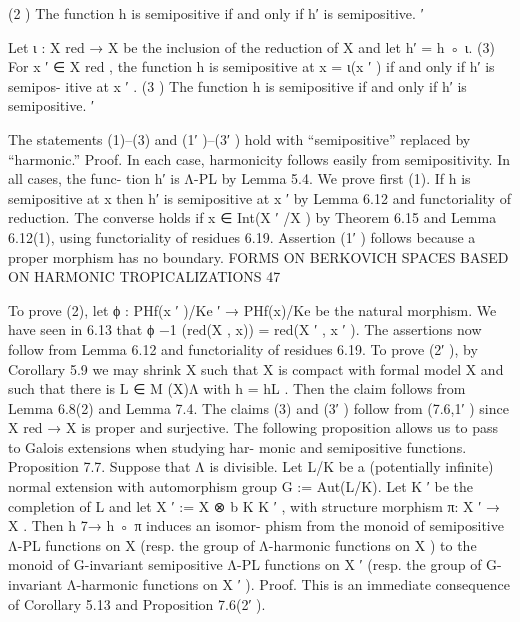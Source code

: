 \documentclass[
  10pt,
]{article}
\newenvironment{Shaded}{}{}
\newcommand{\NormalTok}[1]{#1}
\begin{document}
\begin{Shaded}
\begin{Highlighting}[]
\NormalTok{    (2 ) The function h is semipositive if and only if h′ is semipositive.}
\NormalTok{       ′}

\NormalTok{Let ι : X red → X be the inclusion of the reduction of X and let h′ = h ◦ ι.}
\NormalTok{     (3) For x ′ ∈ X red , the function h is semipositive at x = ι(x ′ ) if and only if h′ is semipos{-}}
\NormalTok{           itive at x ′ .}
\NormalTok{    (3 ) The function h is semipositive if and only if h′ is semipositive.}
\NormalTok{       ′}

\NormalTok{The statements (1)–(3) and (1′ )–(3′ ) hold with “semipositive” replaced by “harmonic.”}
\NormalTok{Proof. In each case, harmonicity follows easily from semipositivity. In all cases, the func{-}}
\NormalTok{tion h′ is Λ{-}PL by Lemma 5.4.}
\NormalTok{   We prove first (1). If h is semipositive at x then h′ is semipositive at x ′ by Lemma 6.12}
\NormalTok{and functoriality of reduction. The converse holds if x ∈ Int(X ′ /X ) by Theorem 6.15}
\NormalTok{and Lemma 6.12(1), using functoriality of residues 6.19. Assertion (1′ ) follows because}
\NormalTok{a proper morphism has no boundary.}
\NormalTok{                 FORMS ON BERKOVICH SPACES BASED ON HARMONIC TROPICALIZATIONS                             47}

\NormalTok{  To prove (2), let ϕ : PHf(x ′ )/Ke ′ → PHf(x)/Ke be the natural morphism. We have seen in 6.13}
\NormalTok{that ϕ −1 (red(X , x)) = red(X ′ , x ′ ). The assertions now follow from Lemma 6.12 and}
\NormalTok{functoriality of residues 6.19. To prove (2′ ), by Corollary 5.9 we may shrink X such that}
\NormalTok{X is compact with formal model X and such that there is L ∈ M (X)Λ with h = hL . Then}
\NormalTok{the claim follows from Lemma 6.8(2) and Lemma 7.4.}
\NormalTok{  The claims (3) and (3′ ) follow from (7.6,1′ ) since X red → X is proper and surjective. }
\NormalTok{ The following proposition allows us to pass to Galois extensions when studying har{-}}
\NormalTok{monic and semipositive functions.}
\NormalTok{Proposition 7.7. Suppose that Λ is divisible. Let L/K be a (potentially infinite) normal}
\NormalTok{extension with automorphism group G := Aut(L/K). Let K ′ be the completion of L and let}
\NormalTok{X ′ := X ⊗}
\NormalTok{         b K K ′ , with structure morphism π: X ′ → X . Then h 7→ h ◦ π induces an isomor{-}}
\NormalTok{phism from the monoid of semipositive Λ{-}PL functions on X (resp. the group of Λ{-}harmonic}
\NormalTok{functions on X ) to the monoid of G{-}invariant semipositive Λ{-}PL functions on X ′ (resp. the}
\NormalTok{group of G{-}invariant Λ{-}harmonic functions on X ′ ).}
\NormalTok{Proof. This is an immediate consequence of Corollary 5.13 and Proposition 7.6(2′ ).                       }
\end{Highlighting}
\end{Shaded}
\end{document}
